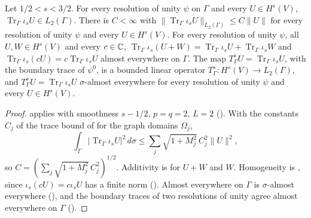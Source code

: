 \begin{theorem}
\label{thm:ambient-trace-l2}
\leanok
{}
Let $1/2 < s < 3/2$. For every resolution of unity $\psi$ on $\Gamma$ and every
$U \in H^s(V)$, $\operatorname{Tr}_\Gamma \iota_s U \in L_2(\Gamma)$. There is $C < \infty$ with
$\|\operatorname{Tr}_\Gamma \iota_s U\|_{L_2(\Gamma)} \leq C \|U\|$ for every resolution of unity
$\psi$ and every $U \in H^s(V)$. For every resolution of unity $\psi$, all $U, W \in H^s(V)$ and
every $c \in \mathbb{C}$, $\operatorname{Tr}_\Gamma \iota_s (U + W) = \operatorname{Tr}_\Gamma \iota_s U +
\operatorname{Tr}_\Gamma \iota_s W$ and $\operatorname{Tr}_\Gamma \iota_s (c U) = c
\operatorname{Tr}_\Gamma \iota_s U$ almost everywhere on $\Gamma$. The map
$T^s_\Gamma U = \operatorname{Tr}_\Gamma \iota_s U$, with the boundary trace of $\psi^0$, is a
bounded linear operator $T^s_\Gamma : H^s(V) \to L_2(\Gamma)$, and
$T^s_\Gamma U = \operatorname{Tr}_\Gamma \iota_s U$ $\sigma$-almost everywhere for every
resolution of unity $\psi$ and every $U \in H^s(V)$.
\end{theorem}

\begin{proof}
\leanok
{} applies with smoothness $s - 1/2$, $p = q = 2$, $L = 2$
(). With the constants $C_j$ of the trace bound of
 for the graph domains $\Omega_j$,
\[
  \int_\Gamma |\operatorname{Tr}_\Gamma \iota_s U|^2 \, d\sigma
  \leq \sum_j \sqrt{1 + M_j^2} \, C_j^2 \|U\|^2 ,
\]
so $C = (\sum_j \sqrt{1 + M_j^2} \, C_j^2)^{1/2}$. Additivity is 
for $U + W$ and $W$. Homogeneity is , since $\iota_s (c U) =
c \iota_s U$ has a finite norm (). Almost everywhere on $\Gamma$
is $\sigma$-almost everywhere
(), and the boundary traces of two resolutions of unity agree
almost everywhere on $\Gamma$ ().
\end{proof}

